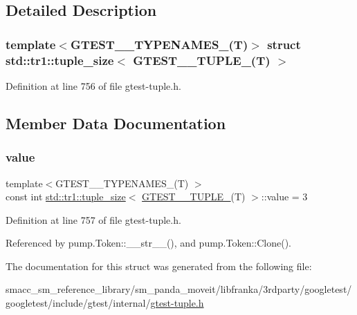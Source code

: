 \subsection{Detailed Description}
\subsubsection*{template$<$G\+T\+E\+S\+T\+\_\+\_\+\+T\+Y\+P\+E\+N\+A\+M\+E\+S\+\_\+(\+T)$>$\newline
struct std\+::tr1\+::tuple\+\_\+size$<$ G\+T\+E\+S\+T\+\_\+\_\+\+T\+U\+P\+L\+E\+\_\+(\+T) $>$}



Definition at line 756 of file gtest-\/tuple.\+h.



\subsection{Member Data Documentation}
\mbox{\label{structstd_1_1tr1_1_1tuple__size_3_01GTEST__3__TUPLE___07T_08_01_4_ac1e2e7bb87bad1d33e4373b3e1af37c3}} 
\subsubsection{\texorpdfstring{value}{value}}
{\footnotesize\ttfamily template$<$G\+T\+E\+S\+T\+\_\+\_\+\+T\+Y\+P\+E\+N\+A\+M\+E\+S\+\_\+(\+T) $>$ \\
const int \hyperlink{structstd_1_1tr1_1_1tuple__size}{std\+::tr1\+::tuple\+\_\+size}$<$ \hyperlink{namespacestd_1_1tr1_a368170c49cc7d7f130c0564bbad01205}{G\+T\+E\+S\+T\+\_\+\_\+\+T\+U\+P\+L\+E\+\_\+}(T) $>$\+::value = 3\hspace{0.3cm}{\ttfamily [static]}}



Definition at line 757 of file gtest-\/tuple.\+h.



Referenced by pump.\+Token\+::\+\_\+\+\_\+str\+\_\+\+\_\+(), and pump.\+Token\+::\+Clone().



The documentation for this struct was generated from the following file\+:\begin{DoxyCompactItemize}
\item 
smacc\+\_\+sm\+\_\+reference\+\_\+library/sm\+\_\+panda\+\_\+moveit/libfranka/3rdparty/googletest/googletest/include/gtest/internal/\hyperlink{gtest-tuple_8h}{gtest-\/tuple.\+h}\end{DoxyCompactItemize}

